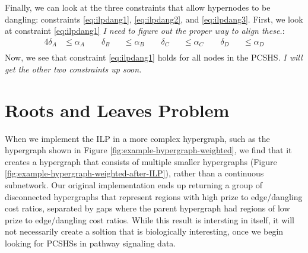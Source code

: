\documentclass[12pt,twoside]{reedthesis}
\theoremstyle{definition}
\begin{document}
Finally, we can look at the three constraints that allow hypernodes to be dangling: constraints \eqref{eq:ilpdang1}, \eqref{eq:ilpdang2}, and \eqref{eq:ilpdang3}. First, we look at constraint \eqref{eq:ilpdang1} \emph{I need to figure out the proper way to align these.}:
\begin{alignat*}{4}
  \delta_A &\leq \alpha_A \qquad \delta_B &&\leq \alpha_B \qquad \delta_C &&\leq \alpha_C \qquad \delta_D &&\leq \alpha_D\\
\end{alignat*}
Now, we see that constraint \eqref{eq:ilpdang1} holds for all nodes in the PCSHS. \emph{I will get the other two constraints up soon.}\par

\section{Roots and Leaves Problem}

When we implement the ILP in a more complex hypergraph, such as the hypergraph shown in Figure \ref{fig:example-hypergraph-weighted}, we find that it creates a hypergraph that consists of multiple smaller hypergraphs (Figure \ref{fig:example-hypergraph-weighted-after-ILP}), rather than a continuous subnetwork. Our original implementation ends up returning a group of disconnected hypergraphs that represent regions with high prize to edge/dangling cost ratios, separated by gaps where the parent hypergraph had regions of low prize to edge/dangling cost ratios. While this result is intersting in itself, it will not necessarily create a soltion that is biologically interesting, once we begin looking for PCSHSs in pathway signaling data.\par
\end{document}
